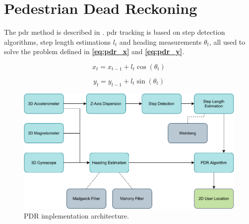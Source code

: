 \section{Pedestrian Dead Reckoning}




The \gls{pdr} method is described in \cite{HybridPositioningPaper}. \gls{pdr} tracking is based on step detection algorithms, step length estimations $l_t$ and heading measurements $\theta_t$, all used to solve the problem defined in \textbf{\autoref{eq:pdr_x}} and \textbf{\autoref{eq:pdr_y}}.

\begin{equation} \label{eq:pdr_x}
    x_t = x_{t - 1} + l_t\cos(\theta_t)
\end{equation}

\begin{equation} \label{eq:pdr_y}
    y_t = y_{t - 1} + l_t\sin(\theta_t)
\end{equation}

\begin{figure}[H] \label{fig:pdr}
    \centering
    \includegraphics[scale=0.9]{Images/Experiments/pdr.pdf}
    \caption{PDR implementation architecture.}
\end{figure}





